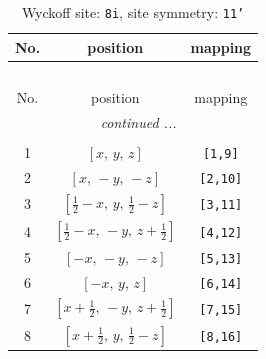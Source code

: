 \documentclass[fleqn,8pt]{jsarticle}
\begin{document}
\renewcommand{\arraystretch}{1.2}
\begin{longtable}{ccc}
\caption{Wyckoff site: {\tt 8i}, site symmetry: {\tt 11'}}
 \\
 \hline \hline
No. & position & mapping \\ \hline \endfirsthead

\multicolumn{2}{l}{\tablename\ \thetable{}} \\
 \hline \hline
No. & position & mapping \\ \hline \endhead

 \hline \hline
\multicolumn{2}{r}{\footnotesize\it continued ...} \\ \endfoot

 \hline \hline
\multicolumn{2}{r}{} \\ \endlastfoot

1 & $\left[ x,\, y,\, z \right]$ & {\tt [1,9]} \\ \hline
2 & $\left[ x,\, - y,\, - z \right]$ & {\tt [2,10]} \\ \hline
3 & $\left[ \frac{1}{2} - x,\, y,\, \frac{1}{2} - z \right]$ & {\tt [3,11]} \\ \hline
4 & $\left[ \frac{1}{2} - x,\, - y,\, z + \frac{1}{2} \right]$ & {\tt [4,12]} \\ \hline
5 & $\left[ - x,\, - y,\, - z \right]$ & {\tt [5,13]} \\ \hline
6 & $\left[ - x,\, y,\, z \right]$ & {\tt [6,14]} \\ \hline
7 & $\left[ x + \frac{1}{2},\, - y,\, z + \frac{1}{2} \right]$ & {\tt [7,15]} \\ \hline
8 & $\left[ x + \frac{1}{2},\, y,\, \frac{1}{2} - z \right]$ & {\tt [8,16]} \\
\end{longtable}
\end{document}
